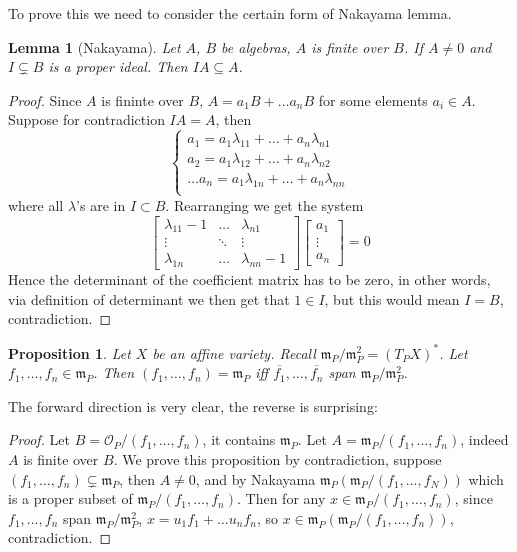 \documentclass[12pt]{article}
\newcommand{\m}{\mathfrak{m}}
\renewcommand{\O}{\mathcal{O}}
\newtheorem{proposition}{Proposition}[section]
\newtheorem{lemma}{Lemma}[section]
\begin{document}
    To prove this we need to consider the certain form of Nakayama lemma.
    \begin{lemma}
        [Nakayama] Let $A$, $B$ be algebras, $A$ is finite over $B$. If $A \neq 0$ and $I \subsetneq B$ is a proper ideal. Then $IA \subseteq A$.
    \end{lemma}
    \begin{proof}
        Since $A$ is fininte over $B$, $A = a_1B + \dots a_nB$ for some elements $a_i \in A$. Suppose for contradiction $IA = A$, then
        $$\begin{cases}
            a_1 = a_1\lambda_{11} + \dots + a_n\lambda_{n1} \\
            a_2 = a_1\lambda_{12} + \dots + a_n\lambda_{n2} \\
            \dots
            a_n = a_1\lambda_{1n} + \dots + a_n\lambda_{nn} \\
        \end{cases}
        $$
        where all $\lambda$'s are in $I \subset B$. Rearranging we get the system
        $$\begin{bmatrix}
            \lambda_{11} - 1 & \dots &  \lambda_{n1} \\
            \vdots & \ddots & \vdots \\
            \lambda_{1n} & \dots & \lambda_{nn} - 1
        \end{bmatrix}\begin{bmatrix}
            a_1 \\
            \vdots \\
            a_n
        \end{bmatrix} = 0$$
        Hence the determinant of the coefficient matrix has to be zero, in other words, via definition of determinant we then get that $1 \in I$, but this would mean $I = B$, contradiction.
    \end{proof}
    \begin{proposition}
        Let $X$ be an affine variety. Recall $\m_P/\m_P^2 = (T_PX)^*$. Let $f_1, \dots, f_n \in \m_P$. Then $(f_1, \dots, f_n) = \m_P$ iff $\overline{f_1}, \dots, \overline{f_n}$ span $\m_P/\m_P^2$.
    \end{proposition}
    The forward direction is very clear, the reverse is surprising:
    \begin{proof}
        Let $B = \O_P/(f_1, \dots, f_n)$, it contains $\m_P$. Let $A = \m_P/(f_1, \dots, f_n)$, indeed $A$ is finite over $B$. We prove this proposition by contradiction, suppose $(f_1, \dots, f_n) \subsetneq \m_P$, then $A \neq 0$, and by Nakayama $\m_P(\m_P/(f_1, \dots, f_N))$ which is a proper subset of $\m_P/(f_1, \dots, f_n)$. Then for any $x \in \m_P/(f_1, \dots, f_n)$, since $f_1, \dots, f_n$ span $\m_P/\m_P^2$, $x = u_1f_1 + \dots u_nf_n$, so $x \in \m_P(\m_P/(f_1, \dots, f_n))$, contradiction.
    \end{proof}
\end{document}
